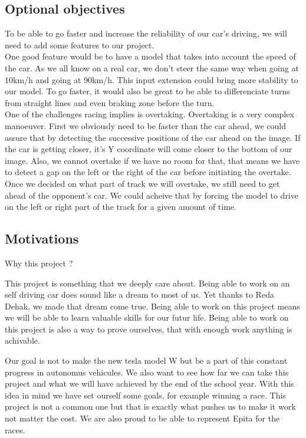 \documentclass[12pt]{article}
\begin{document}
\subsection{Optional objectives}
To be able to go faster and increase the reliability of our car's driving, we will need to add some features to our project. \\

One good feature would be to have a model that takes into account the speed of the car. As we all know on a real car, we don't steer the same way when going at 10km/h and going at 90km/h. This input extension could bring more stability to our model.
To go faster, it would also be great to be able to differenciate turns from straight lines and even braking zone before the turn. \\

One of the challenges racing implies is overtaking. Overtaking is a very complex manoeuver. First we obviously need to be faster than the car ahead, we could assure that by detecting the successive positions of the car ahead on the image. If the car is getting closer, it's Y coordinate will come closer to the bottom of our image. Also, we cannot overtake if we have no room for that, that means we have to detect a gap on the left or the right of the car before initiating the overtake. Once we decided on what part of track we will overtake, we still need to get ahead of the opponent's car. We could acheive that by forcing the model to drive on the left or right part of the track for a given amount of time.

\subsection{Motivations}
Why this project ? 

This project is something that we deeply care about. Being able to work on an self driving car does sound like a dream to most of us. Yet thanks to Reda Dehak, we made that dream come true. Being able to work on this project means we will be able to learn valuable skills for our futur life. Being able to work on this project is also a way to prove ourselves, that with enough work anything is achivable.

Our goal is not to make the new tesla model W but be a part of this constant progress in autonomus vehicules. We also want to see how far we can take this project and what we will have achieved by the end of the school year. With this idea in mind we have set ourself some goals, for example winning a race. This project is not a common one but that is exactly what pushes us to make it work not matter the cost. We are also proud to be able to represent Epita for the races. 
\end{document}
